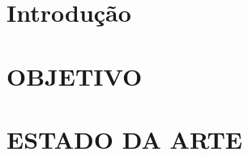 \documentclass[
  a4paper,%
  12pt,%
  english,%
  brazilian,%
]{article}
\begin{document}





\section*{Introdução}%
\label{sect:intro}


\section*{OBJETIVO} \label{sect:obj}



\section*{ESTADO DA ARTE} \label{sect:estadoarte}




% 


% 


% 

\printbibliography

%

\end{document}

